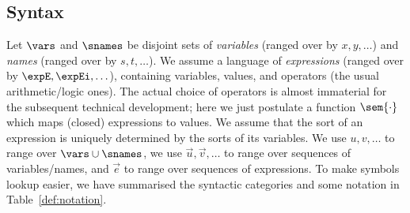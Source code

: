 \subsection{Syntax}\label{sec:co2:syntax}
Let $\vars$ and $\snames$ be disjoint sets
of \emph{variables} (ranged over by $x,y,\ldots$) and 
\emph{names} (ranged over by $s,t,\ldots$).
%
We assume a language of \emph{expressions}
(ranged over by $\expE, \expEi, \ldots$),
containing variables, values, and operators 
(\eg the usual arithmetic/logic ones).
The actual choice of operators is almost immaterial for the
subsequent technical development; here we just postulate
a function $\sem{\cdot}$ which maps (closed) expressions to values.
We assume that the sort of an expression is uniquely determined 
by the sorts of its variables.
We use $u,v,\ldots$ to range over $\vars \cup \snames$,
we use $\vec{u},\vec{v},\ldots$ to range over 
sequences of variables/names, and
$\vec{e}$ to range over sequences of expressions.
To make symbols lookup easier, we have summarised the syntactic categories 
and some notation in Table~\ref{def:notation}.

